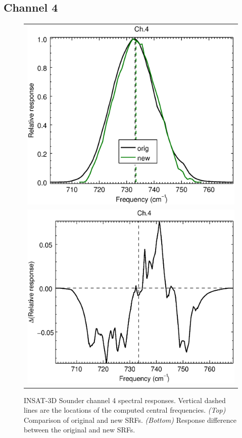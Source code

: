 \subsection{Channel 4}
\begin{figure}[H]
  \centering
  \begin{tabular}{c}
    \includegraphics[scale=0.55]{graphics/sndr/srf/sndr_insat3d-4.eps} \\
    \includegraphics[scale=0.55]{graphics/sndr/srf/sndr_insat3d-4.difference.eps}
  \end{tabular}
  \caption{INSAT-3D Sounder channel 4 spectral responses. Vertical dashed lines are the locations of the computed central frequencies. \emph{(Top)} Comparison of original and new SRFs. \emph{(Bottom)} Response difference between the original and new SRFs.}
  \label{fig:sndr_ch4}
\end{figure}

